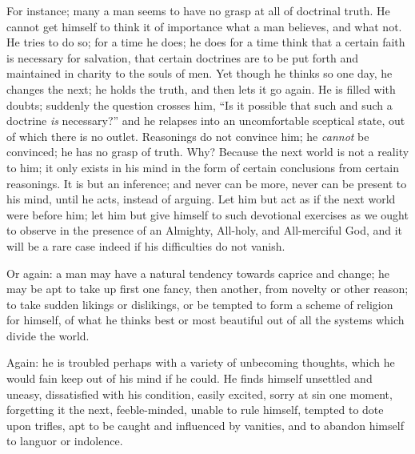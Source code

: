 For instance; many a man seems to have no grasp at all of doctrinal
truth. He cannot get himself to think it of importance what a man
believes, and what not. He tries to do so; for a time he does; he does
for a time think that a certain faith is necessary for salvation, that
certain doctrines are to be put forth and maintained in charity to the
souls of men. Yet though he thinks so one day, he changes the next; he
holds the truth, and then lets it go again. He is filled with doubts;
suddenly the question crosses him, ``Is it possible that such and
such a doctrine \emph{is} necessary?'' and he relapses into an
uncomfortable sceptical state, out of which there is no outlet.
Reasonings do not convince him; he \emph{cannot} be convinced; he has
no grasp of truth. Why? Because the next world is not a reality to
him; it only exists in his mind in the form of certain conclusions
from certain reasonings. It is but an inference; and never can be
more, never can be present to his mind, until he acts, instead of
arguing. Let him but act as if the next world were before him; let him
but give himself to such devotional exercises as we ought to observe
in the presence of an Almighty, All-holy, and All-merciful God, and it
will be a rare case indeed if his difficulties do not vanish.

Or again: a man may have a natural tendency towards caprice and
change; he may be apt to take up first one fancy, then another, from
novelty or other reason; to take sudden likings or dislikings, or be
tempted to form a scheme of religion for himself, of what he thinks
best or most beautiful out of all the systems which divide the world.

Again: he is troubled perhaps with a variety of unbecoming
thoughts, which he would fain keep out of his mind if he could. He
finds himself unsettled and uneasy, dissatisfied with his condition,
easily excited, sorry at sin one moment, forgetting it the next,
feeble-minded, unable to rule himself, tempted to dote upon trifles,
apt to be caught and influenced by vanities, and to abandon himself to
languor or indolence.

